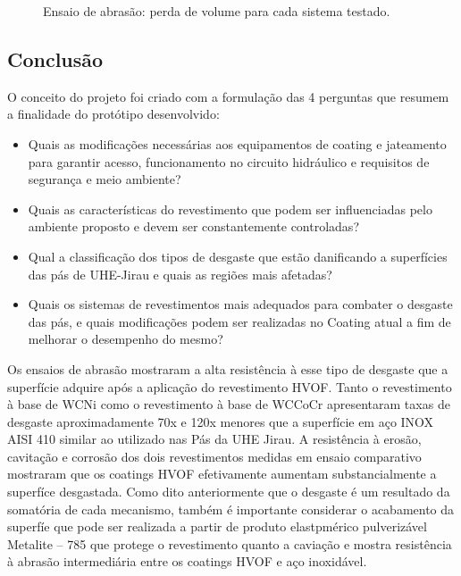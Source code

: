 \begin{figure}[h!]
\centering
{}
\caption{Ensaio de abrasão: perda de volume para cada sistema testado.}
\label{fig:ensaio_abrasao}

\end{figure}


\subsection{Conclusão}
O conceito do projeto foi criado com a formulação das 4 perguntas que resumem a
finalidade do protótipo desenvolvido:

\begin{itemize}
  \item Quais as modificações necessárias aos equipamentos  de coating e
  jateamento para garantir acesso, funcionamento no circuito hidráulico e
  requisitos de segurança e meio ambiente?
  \item Quais as características do revestimento que podem ser influenciadas
  pelo ambiente proposto e devem ser constantemente controladas?
  \item Qual a classificação dos tipos de desgaste que estão danificando a
  superfícies das pás de UHE-Jirau e quais as regiões mais afetadas?
  \item Quais os sistemas de revestimentos mais adequados para combater o
  desgaste das pás, e quais modificações podem ser realizadas no Coating atual a
  fim de melhorar o desempenho do mesmo?
\end{itemize}

Os ensaios de abrasão mostraram a alta resistência à esse tipo de desgaste que a
superfície adquire após a aplicação do revestimento HVOF.  Tanto o revestimento
à base de WCNi como o revestimento à base de WCCoCr apresentaram taxas de
desgaste aproximadamente 70x e 120x menores que a superfície em aço INOX AISI
410 similar ao utilizado nas Pás da UHE Jirau. A resistência à erosão,
cavitação e corrosão dos dois revestimentos medidas em ensaio comparativo
mostraram que os coatings HVOF efetivamente aumentam substancialmente a
superfíce desgastada. Como dito anteriormente que o desgaste é um resultado da
somatória de cada mecanismo, também é importante considerar o acabamento da
superfíe que pode ser realizada a partir de produto elastpmérico pulverizável
Metalite – 785 que protege o revestimento quanto a caviação e mostra
resistência à abrasão intermediária entre os coatings HVOF e aço inoxidável.

